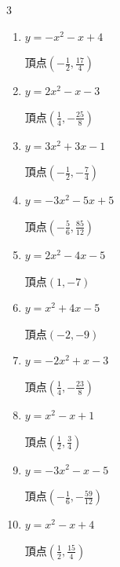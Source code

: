 \begin{multicols}{3}
\begin{enumerate}
        $\displaystyle 頂点\left( \frac{1}{2} , -\frac{1}{2} \right)$

\columnbreak %

\resetques

  \item $\displaystyle y=-x^{2}-x+4$

        $\displaystyle 頂点\left( -\frac{1}{2} , \frac{17}{4} \right)$

  \item $\displaystyle y=2x^{2}-x-3$

        $\displaystyle 頂点\left( \frac{1}{4} , -\frac{25}{8} \right)$

  \item $\displaystyle y=3x^{2}+3x-1$

        $\displaystyle 頂点\left( -\frac{1}{2} , -\frac{7}{4} \right)$

  \item $\displaystyle y=-3x^{2}-5x+5$

        $\displaystyle 頂点\left( -\frac{5}{6} , \frac{85}{12} \right)$

  \item $\displaystyle y=2x^{2}-4x-5$

        $\displaystyle 頂点\left( 1 , -7 \right)$

\columnbreak %

  \item $\displaystyle y=x^{2}+4x-5$

        $\displaystyle 頂点\left( -2 , -9 \right)$

  \item $\displaystyle y=-2x^{2}+x-3$

        $\displaystyle 頂点\left( \frac{1}{4} , -\frac{23}{8} \right)$

  \item $\displaystyle y=x^{2}-x+1$

        $\displaystyle 頂点\left( \frac{1}{2} , \frac{3}{4} \right)$

  \item $\displaystyle y=-3x^{2}-x-5$

        $\displaystyle 頂点\left( -\frac{1}{6} , -\frac{59}{12} \right)$

  \item $\displaystyle y=x^{2}-x+4$

        $\displaystyle 頂点\left( \frac{1}{2} , \frac{15}{4} \right)$

\columnbreak %


\end{enumerate}
\end{multicols}
